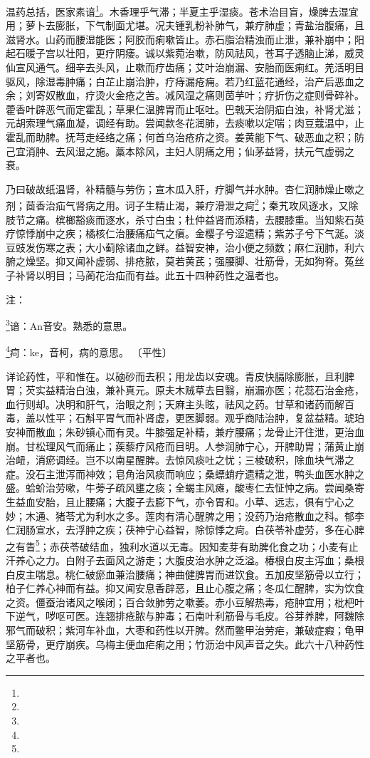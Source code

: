 \documentclass[a4paper,12pt,UTF8,twoside]{ctexbook}
\begin{document}
温药总括，医家素谙\footnote{}。木香理乎气滞；半夏主乎湿痰。苍术治目盲，燥脾去湿宜用；萝卜去膨胀，下气制面尤堪。况夫锺乳粉补肺气，兼疗肺虚；青盐治腹痛，且滋肾水。山药而腰湿能医；阿胶而痢嗽皆止。赤石脂治精浊而止泄，兼补崩中；阳起石暖子宫以壮阳，更疗阴痿。诚以紫菀治嗽，防风祛风，苍耳子透脑止涕，威灵仙宣风通气。细辛去头风，止嗽而疗齿痛；艾叶治崩漏、安胎而医痢红。羌活明目驱风，除湿毒肿痛；白芷止崩治肿，疗痔漏疮痈。若乃红蓝花通经，治产后恶血之余；刘寄奴散血，疗烫火金疮之苦。减风湿之痛则茵芋叶；疗折伤之症则骨碎补。藿香叶辟恶气而定霍乱；草果仁温脾胃而止呕吐。巴戟天治阴疝白浊，补肾尤滋；元胡索理气痛血凝，调经有助。尝闻款冬花润肺，去痰嗽以定喘；肉豆蔻温中，止霍乱而助脾。抚芎走经络之痛；何首乌治疮疥之资。姜黄能下气、破恶血之积；防己宜消肿、去风湿之施。藁本除风，主妇人阴痛之用；仙茅益肾，扶元气虚弱之衰。

乃曰破故纸温肾，补精髓与劳伤；宣木瓜入肝，疗脚气并水肿。杏仁润肺燥止嗽之剂；茴香治疝气肾病之用。诃子生精止渴，兼疗滑泄之疴\footnote{}；秦艽攻风逐水，又除肢节之痛。槟榔豁痰而逐水，杀寸白虫；杜仲益肾而添精，去腰膝重。当知紫石英疗惊悸崩中之疾；橘核仁治腰痛疝气之瘨。金樱子兮涩遗精；紫苏子兮下气涎。淡豆豉发伤寒之表；大小蓟除诸血之鲜。益智安神，治小便之频数；麻仁润肺，利六腑之燥坚。抑又闻补虚弱、排疮脓，莫若黄芪；强腰脚、壮筋骨，无如狗脊。菟丝子补肾以明目；马蔺花治疝而有益。此五十四种药性之温者也。

注：

\footnote{}谙：An音安。熟悉的意思。

\footnote{}疴：ke，音柯，病的意思。
〔平性〕

详论药性，平和惟在。以硇砂而去积；用龙齿以安魂。青皮快膈除膨胀，且利脾胃；芡实益精治白浊，兼补真元。原夫木贼草去目翳，崩漏亦医；花蕊石治金疮，血行则却。决明和肝气，治眼之剂；天麻主头眩，祛风之药。甘草和诸药而解百毒，盖以性平；石斛平胃气而补肾虚，更医脚弱。观乎商陆治肿，复盆益精。琥珀安神而散血；朱砂镇心而有灵。牛膝强足补精，兼疗腰痛；龙骨止汗住泄，更治血崩。甘松理风气而痛止；蒺藜疗风疮而目明。人参润肺宁心，开脾助胃；蒲黄止崩治衄，消瘀调经。岂不以南星醒脾。去惊风痰吐之忧；三棱破积，除血块气滞之症。没石主泄泻而神效；皂角治风痰而响应；桑螵蛸疗遗精之泄，鸭头血医水肿之盛。蛤蚧治劳嗽，牛蒡子疏风壅之痰；全蝎主风瘫，酸枣仁去怔忡之病。尝闻桑寄生益血安胎，且止腰痛；大腹子去膨下气，亦令胃和。小草、远志，俱有宁心之妙；木通、猪苓尤为利水之多。莲肉有清心醒脾之用；没药乃治疮散血之科。郁李仁润肠宣水，去浮肿之疾；茯神宁心益智，除惊悸之疴。白茯苓补虚劳，多在心脾之有眚\footnote{}；赤茯苓破结血，独利水道以无毒。因知麦芽有助脾化食之功；小麦有止汗养心之力。白附子去面风之游走；大腹皮治水肿之泛溢。椿根白皮主泻血；桑根白皮主喘息。桃仁破瘀血兼治腰痛；神曲健脾胃而进饮食。五加皮坚筋骨以立行；柏子仁养心神而有益。抑又闻安息香辟恶，且止心腹之痛；冬瓜仁醒脾，实为饮食之资。僵蚕治诸风之喉闭；百合敛肺劳之嗽萎。赤小豆解热毒，疮肿宜用；枇杷叶下逆气，哕呕可医。连翘排疮脓与肿毒；石南叶利筋骨与毛皮。谷芽养脾，阿魏除邪气而破积；紫河车补血，大枣和药性以开脾。然而鳖甲治劳疟，兼破症瘕；龟甲坚筋骨，更疗崩疾。乌梅主便血疟痢之用；竹沥治中风声音之失。此六十八种药性之平者也。
\end{document}
